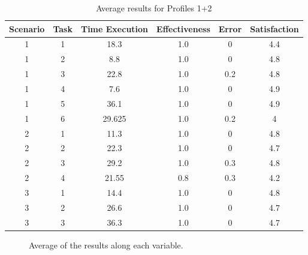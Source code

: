 \begin{table}[H]
  \begin{center}
    \begin{tabular}{||c|c|c|c|c|c||} %
      \textbf{Scenario} & \textbf{Task} & \textbf{Time Execution} & \textbf{Effectiveness} & \textbf{Error} & \textbf{Satisfaction}\\
      
      \hline
        1 & 1 & 18.3 & 1.0 & 0 & 4.4\\
        1 & 2 & 8.8 & 1.0 & 0 & 4.8\\
        1 & 3 & 22.8 & 1.0 & 0.2 & 4.8\\
        1 & 4 & 7.6 & 1.0 & 0 & 4.9\\
        1 & 5 & 36.1 & 1.0 & 0 & 4.9\\
        1 & 6 & 29.625 & 1.0 & 0.2 & 4\\
        \hline
        2 & 1 & 11.3 & 1.0 & 0 & 4.8\\
        2 & 2 & 22.3 & 1.0 & 0 & 4.7\\
        2 & 3 & 29.2 & 1.0 & 0.3 & 4.8\\
        2 & 4 & 21.55 & 0.8 & 0.3 & 4.2\\
        \hline
        3 & 1 & 14.4 & 1.0 & 0 & 4.8\\
        3 & 2 & 26.6 & 1.0 & 0 & 4.7\\
        3 & 3 & 36.3 & 1.0 & 0 & 4.7\\
        \hline

    \end{tabular}
  \end{center}
  \caption{Average results for Profiles 1+2}
\end{table}

\bigskip

\begin{figure}[H]
  \centering
    \caption{Average of the results along each variable.}
\end{figure}
\bigskip
